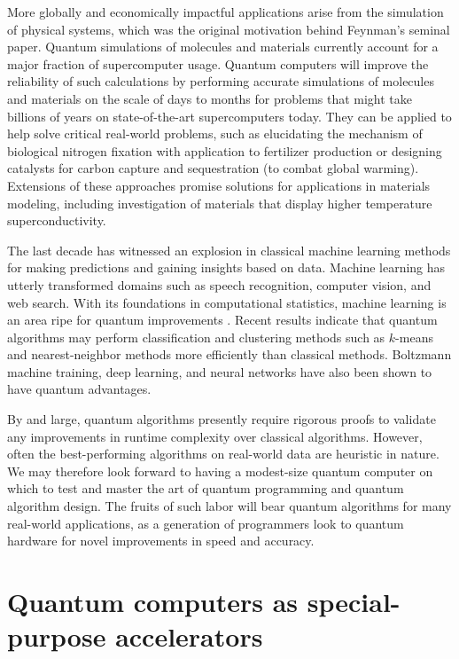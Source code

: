 \documentclass[journal]{IEEEtran}
\begin{document}
More globally and economically impactful applications arise from the simulation of physical systems, which was the original motivation behind Feynman's seminal paper. Quantum simulations of  molecules and materials currently account for a major fraction of supercomputer usage. Quantum computers will improve the reliability of such calculations by performing accurate simulations of molecules and materials on the scale of days to months for problems that might take billions of years on state-of-the-art supercomputers today. They can be applied to help solve critical real-world problems, such as elucidating the mechanism of biological nitrogen fixation with application to fertilizer production or designing catalysts for carbon capture  and sequestration (to combat global warming).  Extensions of these approaches promise solutions for applications in materials modeling, including investigation of materials that display higher temperature superconductivity. 

The last decade has witnessed an explosion in classical machine learning methods for making predictions and gaining insights based on data.  Machine learning has utterly transformed domains such as speech recognition, computer vision, and web search.  With its foundations in computational statistics, machine learning is an area ripe for quantum improvements \cite{qml,Stanisic15}.  Recent results indicate that quantum algorithms may perform classification and clustering methods such as $k$-means and nearest-neighbor methods more efficiently than  classical methods.  Boltzmann machine training, deep learning, and neural networks have also been shown to have quantum advantages.  

By and large, quantum algorithms presently require rigorous proofs to validate any improvements in runtime complexity over classical algorithms.  However,
often the best-performing algorithms on real-world data are heuristic in nature.  We may therefore look forward to having a modest-size quantum computer on which to test and master the art of quantum programming and quantum algorithm design.  The fruits of such labor will bear quantum algorithms for many real-world applications, as a generation of programmers look to quantum hardware for novel improvements in speed and accuracy.


\section{Quantum computers as special-purpose accelerators }
\end{document}
